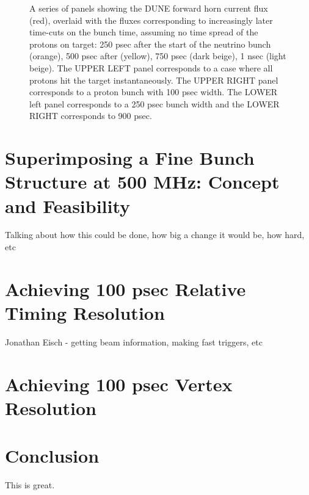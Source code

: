 \documentclass[preprint,12pt]{elsarticle}
\begin{document}
\begin{figure}[t]
\begin{center}
\begin{tabular}{c c}
			 \\			
			\end{tabular}
	\end{center}
	\caption{A series of panels showing the DUNE forward horn current flux (red), overlaid with the fluxes corresponding to increasingly later time-cuts on the bunch time, assuming no time spread of the protons on target: 250 psec after the start of the neutrino bunch (orange), 500 psec after (yellow), 750 psec (dark beige), 1 nsec (light beige). The UPPER LEFT panel corresponds to a case where all protons hit the target instantaneously. The UPPER RIGHT panel corresponds to a proton bunch with 100 psec width. The LOWER left panel corresponds to a 250 psec bunch width and the LOWER RIGHT corresponds to 900 psec.}
		\label{fig:anniedetector}
\end{figure}


\section{Superimposing a Fine Bunch Structure at 500 MHz: Concept and Feasibility}

Talking about how this could be done, how big a change it would be, how hard, etc

\section{Achieving 100 psec Relative Timing Resolution}

Jonathan Eisch - getting beam information, making fast triggers, etc

\section{Achieving 100 psec Vertex Resolution}


\section{Conclusion}

This is great.



\end{document}
